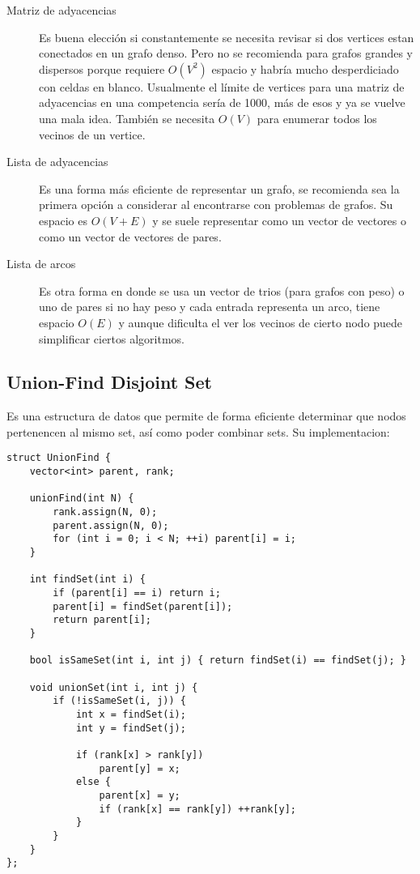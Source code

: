\documentclass[10pt]{article}
\begin{document}
\begin{description}
    \item[Matriz de adyacencias] Es buena elección si constantemente se necesita revisar si dos vertices estan conectados en un grafo denso. Pero no se recomienda para grafos grandes y dispersos porque requiere $O(V^2)$ espacio y habría mucho desperdiciado con celdas en blanco. Usualmente el límite de vertices para una matriz de adyacencias en una competencia sería de 1000, más de esos y ya se vuelve una mala idea. También se necesita $O(V)$ para enumerar todos los vecinos de un vertice.
    \item[Lista de adyacencias] Es una forma más eficiente de representar un grafo, se recomienda sea la primera opción a considerar al encontrarse con problemas de grafos. Su espacio es $O(V + E)$ y se suele representar como un vector de vectores o como un vector de vectores de pares.
    \item[Lista de arcos] Es otra forma en donde se usa un vector de trios (para grafos con peso) o uno de pares si no hay peso y cada entrada representa un arco, tiene espacio $O(E)$ y aunque dificulta el ver los vecinos de cierto nodo puede simplificar ciertos algoritmos.
\end{description}

\subsection{Union-Find Disjoint Set}

Es una estructura de datos que permite de forma eficiente determinar que nodos pertenencen al mismo set, así como poder combinar sets. Su implementacion:

\begin{lstlisting}
struct UnionFind {
    vector<int> parent, rank;

    unionFind(int N) {
        rank.assign(N, 0);
        parent.assign(N, 0);
        for (int i = 0; i < N; ++i) parent[i] = i;
    }

    int findSet(int i) {
        if (parent[i] == i) return i;
        parent[i] = findSet(parent[i]);
        return parent[i];
    }

    bool isSameSet(int i, int j) { return findSet(i) == findSet(j); }

    void unionSet(int i, int j) {
        if (!isSameSet(i, j)) {
            int x = findSet(i);
            int y = findSet(j);

            if (rank[x] > rank[y])
                parent[y] = x;
            else {
                parent[x] = y;
                if (rank[x] == rank[y]) ++rank[y];
            }
        }
    }
};
\end{lstlisting}
\end{document}
